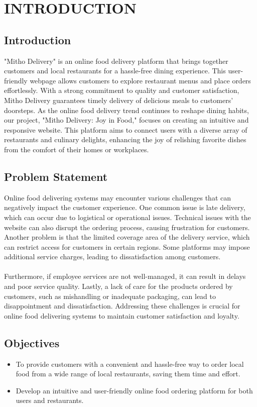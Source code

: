 \chapter{INTRODUCTION}



\section{Introduction}
"Mitho Delivery" is an online food delivery platform that brings together customers and local restaurants for a hassle-free dining experience. This user-friendly webpage allows customers to explore restaurant menus and place orders effortlessly. With a strong commitment to quality and customer satisfaction, Mitho Delivery guarantees timely delivery of delicious meals to customers' doorsteps. As the online food delivery trend continues to reshape dining habits, our project, "Mitho Delivery: Joy in Food," focuses on creating an intuitive and responsive website. This platform aims to connect users with a diverse array of restaurants and culinary delights, enhancing the joy of relishing favorite dishes from the comfort of their homes or workplaces.

\section{Problem Statement}
Online food delivering systems may encounter various challenges that can negatively impact the customer experience. One common issue is late delivery, which can occur due to logistical or operational issues. Technical issues with the website can also disrupt the ordering process, causing frustration for customers. Another problem is that the limited coverage area of the delivery service, which can restrict access for customers in certain regions. Some platforms may impose additional service charges, leading to dissatisfaction among customers.\\\\ Furthermore, if employee services are not well-managed, it can result in delays and poor service quality. Lastly, a lack of care for the products ordered by customers, such as mishandling or inadequate packaging, can lead to disappointment and dissatisfaction. Addressing these challenges is crucial for online food delivering systems to maintain customer satisfaction and loyalty.

\section{Objectives}
\begin{itemize}
    \item To provide customers with a convenient and hassle-free way to order local food from a wide range of local restaurants, saving them time and effort.
    \item Develop an intuitive and user-friendly online food ordering platform for both users and restaurants.
\end{itemize}

